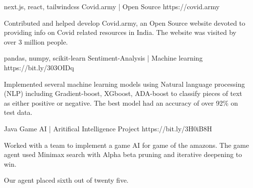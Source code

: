\begin{cventries}

  \cventry
    {next.js, react, tailwindcss} %
    {Covid.army | Open Source} %
    {https://covid.army} %
    {} %
    {
      \begin{cvitems} %
        \item {Contributed and helped develop Covid.army, an Open Source website devoted to providing info on Covid related resources in India. The website was visited by over 3 million people.} 
      \end{cvitems}
    }
  \cventry
    {pandas, numpy, scikit-learn} %
    {Sentiment-Analysis | Machine learning} %
    {https://bit.ly/303OIDq} %
    {} %
    {
      \begin{cvitems} %
        \item {Implemented several machine learning models using Natural language processing (NLP) including Gradient-boost, XGboost, ADA-boost to classify pieces of text as either positive or negative. The best model had an accuracy of over 92\% on test data.} 
      \end{cvitems}
    }

  \cventry
    {Java} %
    {Game AI | Aritifical Intelligence Project} %
    {https://bit.ly/3H0iB8H} %
    {} %
    {
      \begin{cvitems} %
        \item {Worked with a team to implement a game AI for game of the amazons. The game agent used Minimax search with Alpha beta pruning and iterative deepening to win. } 
        \item {Our agent placed sixth out of twenty five.} 
      \end{cvitems}
    }
\end{cventries}
